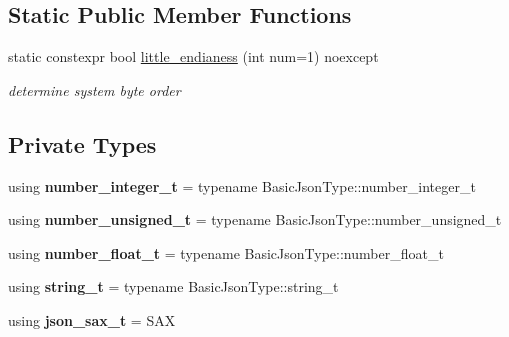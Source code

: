 \subsection*{Static Public Member Functions}
\begin{DoxyCompactItemize}
\item 
static constexpr bool \mbox{\hyperlink{classnlohmann_1_1detail_1_1binary__reader_a1e31dbfcf9567c8c2d4f0e4eb1b0230a}{little\+\_\+endianess}} (int num=1) noexcept
\begin{DoxyCompactList}\small\item\em determine system byte order \end{DoxyCompactList}\end{DoxyCompactItemize}
\subsection*{Private Types}
\begin{DoxyCompactItemize}
\item 
\mbox{\label{classnlohmann_1_1detail_1_1binary__reader_aa093d9bce6c6ec715a049f2a26d7c4d5}} 
using {\bfseries number\+\_\+integer\+\_\+t} = typename Basic\+Json\+Type\+::number\+\_\+integer\+\_\+t
\item 
\mbox{\label{classnlohmann_1_1detail_1_1binary__reader_a13bb5e2014c4cdf013d8715157cb456e}} 
using {\bfseries number\+\_\+unsigned\+\_\+t} = typename Basic\+Json\+Type\+::number\+\_\+unsigned\+\_\+t
\item 
\mbox{\label{classnlohmann_1_1detail_1_1binary__reader_af4488e5400da86636fd2f4d0171bbf53}} 
using {\bfseries number\+\_\+float\+\_\+t} = typename Basic\+Json\+Type\+::number\+\_\+float\+\_\+t
\item 
\mbox{\label{classnlohmann_1_1detail_1_1binary__reader_aa0b9729917ca7ee6ed01e3792341316e}} 
using {\bfseries string\+\_\+t} = typename Basic\+Json\+Type\+::string\+\_\+t
\item 
\mbox{\label{classnlohmann_1_1detail_1_1binary__reader_a43c5dc6a3219f64a7824d7ba9c7b14ae}} 
using {\bfseries json\+\_\+sax\+\_\+t} = S\+AX
\end{DoxyCompactItemize}
